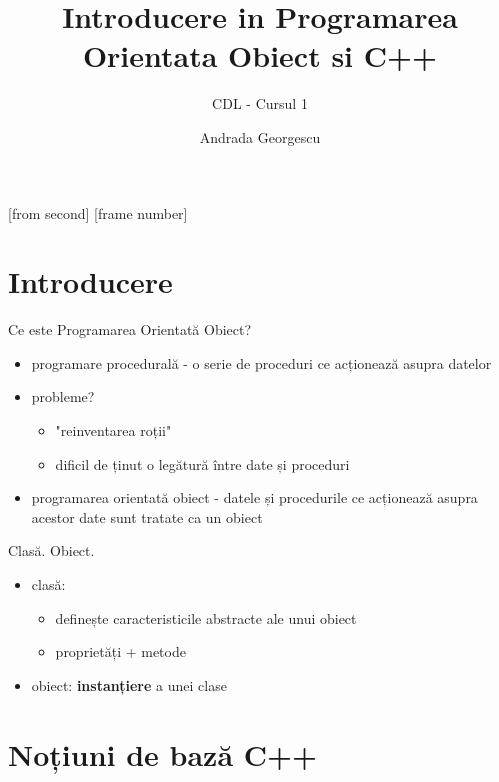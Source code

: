\documentclass{beamer}
\title[Introducere in POO]{Introducere in Programarea Orientata Obiect si C++}
\subtitle{CDL - Cursul 1}
\institute[ROSEdu]{ROSEdu}
\author[Andrada]{Andrada Georgescu}
\begin{document}
     

[from second]
[frame number]

\frame{\titlepage}

\begin{frame}
\tableofcontents
\end{frame}

\section{Introducere}

\begin{frame}{Ce este Programarea Orientată Obiect?}
  \begin{itemize} %
  \item programare procedurală  - o serie de proceduri ce acționează asupra datelor
  \item probleme? 
  \begin{itemize}  
  	\item "reinventarea roții"
	\item dificil de ținut o legătură între date și proceduri
  \end{itemize}
  \item programarea orientată obiect  - datele și procedurile ce acționează asupra acestor date sunt tratate ca un obiect
  \end{itemize}
\end{frame}   

\begin{frame}{Clasă. Obiect.}
  \begin{itemize}
  \item clasă:
  \begin{itemize}
	\item definește caracteristicile abstracte ale unui obiect	
    \item proprietăți + metode
  \end{itemize}
  \item obiect: \textbf{instanțiere} a unei clase %
  \end{itemize}
\end{frame}

\section{Noțiuni de bază C++}
\end{document}
